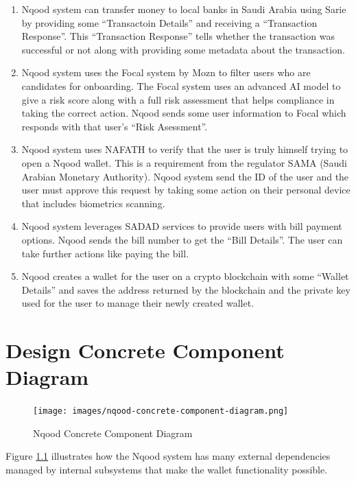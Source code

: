 \documentclass[a4paper]{report}
\begin{document}
\begin{enumerate}
\begin{enumerate}
              \item Nqood system can transfer money to local banks in Saudi Arabia using Sarie by providing some “Transactoin Details” and receiving a “Transaction Response”. This “Transaction Response” tells whether the transaction was successful or not along with providing some metadata about the transaction.
              \item Nqood system uses the Focal system by Mozn to filter users who are candidates for onboarding. The Focal system uses an advanced AI model to give a risk score along with a full risk assessment that helps compliance in taking the correct action. Nqood sends some user information to Focal which responds with that user’s “Risk Asessment”.
              \item Nqood system uses NAFATH to verify that the user is truly himself trying to open a Nqood wallet. This is a requirement from the regulator SAMA (Saudi Arabian Monetary Authority). Nqood system send the ID of the user and the user must approve this request by taking some action on their personal device that includes biometrics scanning.
              \item Nqood system leverages SADAD services to provide users with bill payment options. Nqood sends the bill number to get the “Bill Details”. The user can take further actions like paying the bill.
              \item Nqood creates a wallet for the user on a crypto blockchain with some “Wallet Details” and saves the address returned by the blockchain and the private key used for the user to manage their newly created wallet.

          \end{enumerate}
\end{enumerate}

\chapter{Design Concrete Component Diagram}

\begin{figure}[h!]
    \centering
    \texttt{[image: images/nqood-concrete-component-diagram.png]}
    \caption{Nqood Concrete Component Diagram}
    \label{fig:concrete-diagram}
\end{figure}

Figure \ref{fig:concrete-diagram} illustrates how the Nqood system has many external dependencies managed by internal subsystems that make the wallet functionality possible.
\end{document}
